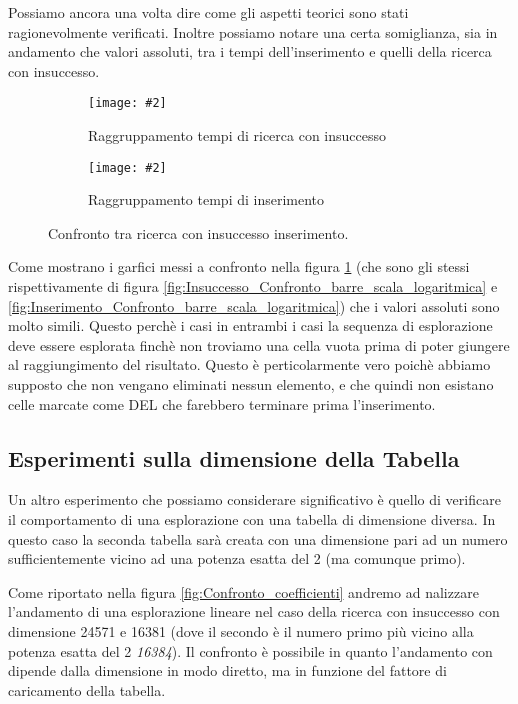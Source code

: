 \documentclass{article}
\newcommand{\image}[3][1]{
	\centering
	\texttt{[image: \#2]}
	\caption{#3}
}
\begin{document}
Possiamo ancora una volta dire come gli aspetti teorici sono stati ragionevolmente verificati. Inoltre possiamo notare una certa somiglianza, sia in andamento che valori assoluti, tra i tempi dell'inserimento e quelli della ricerca con insuccesso.

\begin{figure}[H]
\begin{subfigure}[b]{0.5\textwidth}
\image{Insuccesso_Confronto_barre_scala_logaritmica}{Raggruppamento tempi di ricerca con insuccesso}
\end{subfigure}
\begin{subfigure}[b]{0.5\textwidth}
\image{Inserimento_Confronto_barre_scala_logaritmica}{Raggruppamento tempi di inserimento}
\end{subfigure}
\caption{Confronto tra ricerca con insuccesso inserimento.}
\label{fig:Confronto_ricerca_insuccesso}
\end{figure}

Come mostrano i garfici messi a confronto nella figura \ref{fig:Confronto_ricerca_insuccesso} (che sono gli stessi rispettivamente di figura \ref{fig:Insuccesso_Confronto_barre_scala_logaritmica} e \ref{fig:Inserimento_Confronto_barre_scala_logaritmica}) che i valori assoluti sono molto simili. Questo perchè i casi in entrambi i casi la sequenza di esplorazione deve essere esplorata finchè non troviamo una cella vuota prima di poter giungere al raggiungimento del risultato. Questo è perticolarmente vero poichè abbiamo supposto che non vengano eliminati nessun elemento, e che quindi non esistano celle marcate come DEL che farebbero terminare prima l'inserimento.

\subsection{Esperimenti sulla dimensione della Tabella}
Un altro esperimento che possiamo considerare significativo è quello di verificare il comportamento di una esplorazione con una tabella di dimensione diversa. In questo caso la seconda tabella sarà creata con una dimensione pari ad un numero sufficientemente vicino ad una potenza esatta del 2 (ma comunque primo).

Come riportato nella figura \ref{fig:Confronto_coefficienti} andremo ad nalizzare l'andamento di una esplorazione lineare nel caso della ricerca con insuccesso con dimensione 24571 e 16381 (dove il secondo è il numero primo più vicino alla potenza esatta del 2 \emph{16384}). Il confronto è possibile in quanto l'andamento con dipende dalla dimensione in modo diretto, ma in funzione del fattore di caricamento della tabella.
\end{document}
